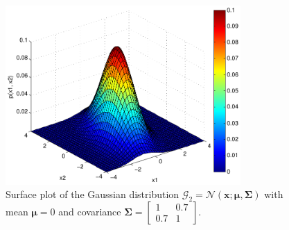 \documentclass[a4paper,11pt]{article}
\newcommand{\V}[1]{\ensuremath{\boldsymbol{#1}}}
\newcommand{\mean}{\ensuremath{\boldsymbol{\mu}}}
\newcommand{\cov}{\ensuremath{\boldsymbol{\Sigma}}}
\newcommand{\npdf}{\ensuremath{\mathcal{N}}}
\begin{document}
\begin{figure}
  \begin{center}
    \caption[Surface plot of the Gaussian distribution with covariance $\cov_{1,1} = \cov_{2,2} = 1, \cov_{1,2} = \cov_{2,1} = 0.7$.]{Surface plot of the Gaussian distribution $\mathcal G_2 = \npdf(\V{x}; \mean, \cov)$ with mean $\mean = 0$ and covariance $\cov = \begin{bmatrix}1 & 0.7\\0.7 & 1\end{bmatrix}$.}
    \label{fig:plot3}
    \includegraphics[width=0.8\textwidth]{ex1plot3}
  \end{center}
\end{figure}
\end{document}
